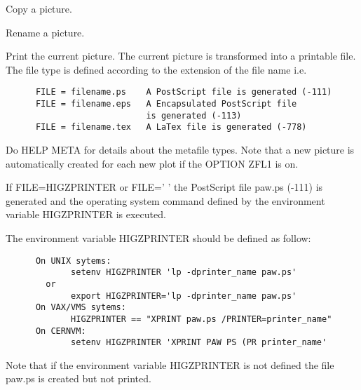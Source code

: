    \par
Copy a picture.  

\ENDCMD


\BEGARG
{}
\ENDARG

   \par
Rename a picture.  

\ENDCMD


\BEGARG
{}
\ENDARG

   \par
Print the current picture.  The current picture is transformed into a 
   printable file.  The file type is defined according to the extension of the 
   file name i.e.  

\begin{verbatim}
      FILE = filename.ps    A PostScript file is generated (-111)
      FILE = filename.eps   A Encapsulated PostScript file
                            is generated (-113)
      FILE = filename.tex   A LaTex file is generated (-778)
\end{verbatim}
   \par
Do HELP META for details about the metafile types.  Note that a new picture 
   is automatically created for each new plot if the OPTION ZFL1 is on.  

   \par
If FILE=HIGZPRINTER or FILE=' ' the PostScript file paw.ps (-111) is 
   generated and the operating system command defined by the environment 
   variable HIGZPRINTER is executed.  

   \par
The environment variable HIGZPRINTER should be defined as follow:  
\begin{verbatim}
      On UNIX sytems:
             setenv HIGZPRINTER 'lp -dprinter_name paw.ps'
        or
             export HIGZPRINTER='lp -dprinter_name paw.ps'
      On VAX/VMS sytems:
             HIGZPRINTER == "XPRINT paw.ps /PRINTER=printer_name"
      On CERNVM:
             setenv HIGZPRINTER 'XPRINT PAW PS (PR printer_name'
\end{verbatim}
\ENDVERB
   \par
Note that if the environment variable HIGZPRINTER is not defined the file 
   paw.ps is created but not printed.  

